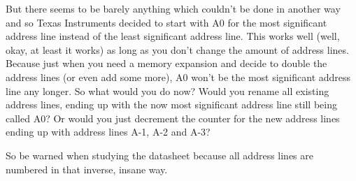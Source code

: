 But there seems to be barely anything which couldn't be done in
another way and so Texas Instruments decided to start with A0
for the most significant address line instead of the least
significant address line. This works well (well, okay, at least
it works) as long as you don't change the amount of address
lines. Because just when you need a memory expansion and decide
to double the address lines (or even add some more), A0 won't be
the most significant address line any longer. So what would you
do now? Would you rename all existing address lines, ending up
with the now most significant address line still being called
A0? Or would you just decrement the counter for the new address
lines ending up with address lines A-1, A-2 and A-3?

So be warned when studying the datasheet because all address
lines are numbered in that inverse, insane way.


